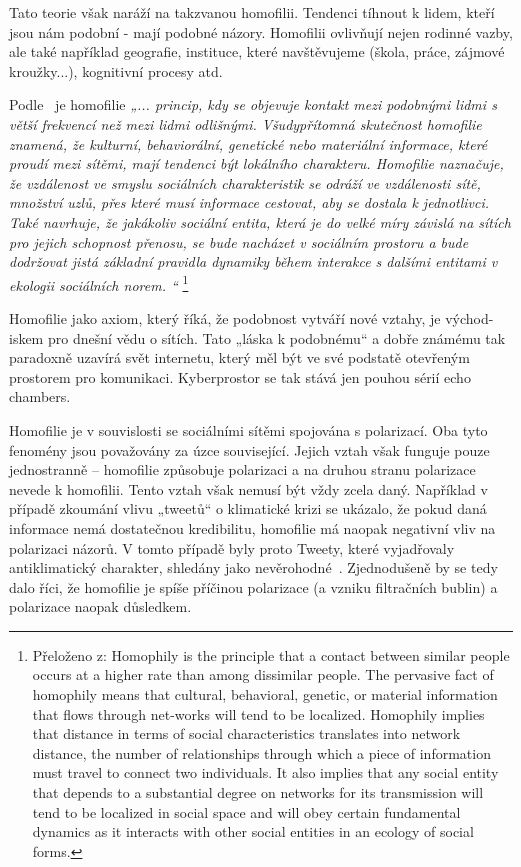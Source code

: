    Tato teorie však naráží na takzvanou homofilii. Tendenci tíhnout k lidem, kteří jsou nám podobní - mají podobné názory. Homofilii ovlivňují nejen rodinné vazby, ale také například geografie, instituce, které navštěvujeme (škola, práce, zájmové kroužky...), kognitivní procesy atd.~\citep{McPherson} 
    
    \setlength\parskip{5mm}
    
    Podle~\cite{McPherson} je homofilie \textit{„... princip, kdy se objevuje kontakt mezi podobnými lidmi s větší frekvencí než mezi lidmi odlišnými. Všudypřítomná skutečnost homofilie znamená, že kulturní, behaviorální, genetické nebo materiální informace, které proudí mezi sítěmi, mají tendenci být lokálního charakteru. Homofilie naznačuje, že vzdálenost ve smyslu sociálních charakteristik se odráží ve vzdálenosti sítě, množství uzlů, přes které musí informace cestovat, aby se dostala k jednotlivci. Také navrhuje, že jakákoliv sociální entita, která je do velké míry závislá na sítích pro jejich schopnost přenosu, se bude nacházet v sociálním prostoru a bude dodržovat jistá základní pravidla dynamiky během interakce s dalšími entitami v ekologii sociálních norem. “} \footnote{Přeloženo z:  Homophily is the principle that a contact between similar people occurs at a higher rate than among dissimilar people. The pervasive fact of homophily means that cultural, behavioral, genetic, or material information that flows through net-works will tend to be localized. Homophily implies that distance in terms of social characteristics translates into network distance, the number of relationships through which a piece of information must travel to connect two individuals. It also implies that any social entity that depends to a substantial degree on networks for its transmission will tend to be localized in social space and will obey certain fundamental dynamics as it interacts with other social entities in an ecology of social forms.}
    
    Homofilie jako axiom, který říká, že podobnost vytváří nové vztahy, je východ-iskem pro dnešní vědu o sítích. Tato „láska k podobnému“ a dobře známému tak paradoxně uzavírá svět internetu, který měl být ve své podstatě otevřeným prostorem pro komunikaci. Kyberprostor se tak stává jen pouhou sérií echo chambers.~\citep{apprich2018}
    \setlength\parskip{0mm}
    
    Homofilie je v souvislosti se sociálními sítěmi spojována s polarizací. Oba tyto fenomény jsou považovány za úzce související. Jejich vztah však funguje pouze jednostranně – homofilie způsobuje polarizaci a na druhou stranu polarizace nevede k homofilii. Tento vztah však nemusí být vždy zcela daný. Například v případě zkoumání vlivu „tweetů“ o klimatické krizi se ukázalo, že pokud daná informace nemá dostatečnou kredibilitu, homofilie má naopak negativní vliv na polarizaci názorů. V tomto případě byly proto Tweety, které vyjadřovaly anti\-klimatický charakter, shledány jako nevěrohodné~\cite{Samantray}. Zjednodušeně by se tedy dalo říci, že homofilie je spíše příčinou polarizace (a vzniku filtračních bublin) a polarizace naopak důsledkem. 
    
